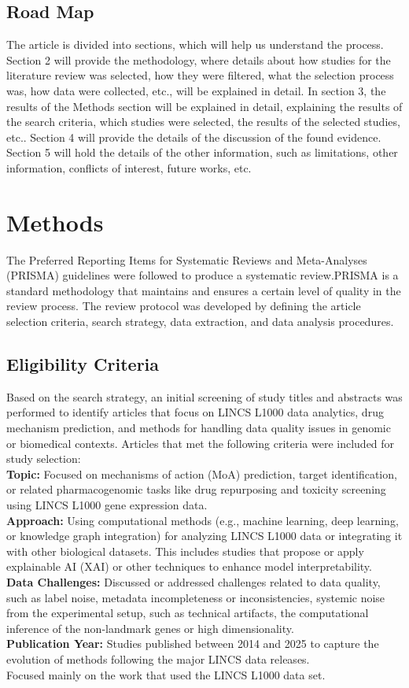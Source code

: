 \documentclass[twocolumn]{article}
\begin{document}
\subsection{Road Map}
The article is divided into sections, which will help us understand the process. Section 2 will provide the methodology, where details about how studies for the literature review was selected, how they were filtered, what the selection process was, how data were collected, etc., will be explained in detail. In section 3, the results of the Methods section will be explained in detail, explaining the results of the search criteria, which studies were selected, the results of the selected studies, etc.. Section 4 will provide the details of the discussion of the found evidence. Section 5 will hold the details of the other information, such as limitations, other information, conflicts of interest, future works, etc.
\section{Methods}
The Preferred Reporting Items for Systematic Reviews and Meta-Analyses (PRISMA) guidelines were followed to produce a systematic review\cite{page2021prisma}.\linebreak PRISMA is a standard methodology that maintains and ensures a certain level of quality in the review process. The review protocol was developed by defining the article selection criteria, search strategy, data extraction, and data analysis procedures.
\subsection{Eligibility Criteria}\label{subsec:Eligibility Criteria}
Based on the search strategy, an initial screening of study titles and abstracts was performed to identify articles that focus on LINCS L1000 data analytics, drug mechanism prediction, and methods for handling data quality issues in genomic or biomedical contexts. Articles that met the following criteria were included for study selection: 
\\
\textbf{Topic: }Focused on mechanisms of action (MoA) prediction, target identification, or related pharmacogenomic tasks like drug repurposing and toxicity screening using LINCS L1000 gene expression data.
\\
\textbf{Approach: }Using computational methods (e.g., machine learning, deep learning, or knowledge graph integration) for analyzing LINCS L1000 data or integrating it with other biological datasets. This includes studies that propose or apply explainable AI (XAI) or other techniques to enhance model interpretability.
\\
\textbf{Data Challenges: }Discussed or addressed challenges related to data quality, such as label noise, metadata incompleteness or inconsistencies, systemic noise from the experimental setup, such as technical artifacts, the computational inference of the non-landmark genes or high dimensionality.
\\
\textbf{Publication Year: }Studies published between 2014 and 2025 to capture the evolution of methods following the major LINCS data releases.
\\
Focused mainly on the work that used the LINCS L1000 data set. 
\end{document}
